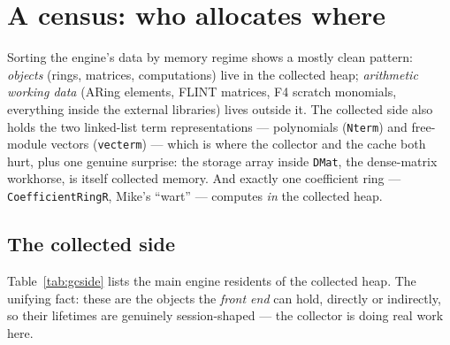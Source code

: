\documentclass[11pt,oneside]{report}
\newcommand{\code}[1]{\textcolor{m2code}{\texttt{#1}}}
\begin{document}
\section{A census: who allocates where}
\label{sec:census}

\begin{inbrief}
Sorting the engine's data by memory regime shows a mostly clean pattern:
\emph{objects} (rings, matrices, computations) live in the collected heap;
\emph{arithmetic working data} (ARing elements, FLINT matrices, F4 scratch
monomials, everything inside the external libraries) lives outside it. The
collected side also holds the two linked-list term representations ---
polynomials (\code{Nterm}) and free-module vectors (\code{vecterm}) ---
which is where the collector and the cache both hurt, plus one genuine
surprise: the storage array inside \code{DMat}, the dense-matrix workhorse,
is itself collected memory. And exactly one coefficient ring ---
\code{CoefficientRingR}, Mike's ``wart'' --- computes \emph{in} the
collected heap.
\end{inbrief}

\subsection{The collected side}

Table~\ref{tab:gcside} lists the main engine residents of the collected
heap. The unifying fact: these are the objects the \emph{front end} can
hold, directly or indirectly, so their lifetimes are genuinely
session-shaped --- the collector is doing real work here.
\end{document}
